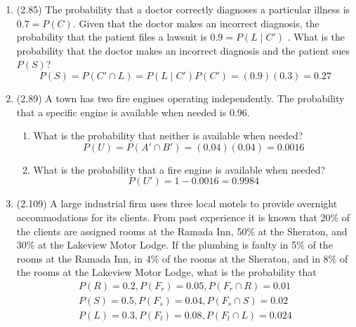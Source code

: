 \documentclass[basic, header]{nosvagor-notes}
\begin{document}
\begin{enumerate}[itemsep=4em]

  \item (2.85) The probability that a doctor correctly diagnoses a particular
    illness is \(0.7 = P(C)\). Given that the doctor makes an incorrect diagnosis, the
    probability that the patient files a lawsuit is \(0.9 = P(L \mid C')\) . What is the
    probability that the doctor makes an incorrect diagnosis and the patient
    sues \(P(S)\)?
    \[%
      P(S) = P(C' \cap L ) = P(L\mid C')P(C') = (0.9)(0.3) = \boxed{0.27}
    \]%

  \item (2.89) A town has two fire engines operating independently. The
    probability that a specific engine is available when needed is 0.96.

    \begin{enumerate}

      \item What is the probability that neither is available when needed?
        \[%
          P(U) = P(A' \cap B') = (0.04)(0.04) = \boxed{0.0016}
        \]%

      \item What is the probability that a fire engine is available when
        needed?
        \[%
          P(U') = 1 - 0.0016 = \boxed{0.9984}
        \]%

    \end{enumerate}

  \item (2.109) A large industrial firm uses three local motels to provide
    overnight accommodations for its clients. From past experience it is known
    that 20\% of the clients are assigned rooms at the Ramada Inn, 50\% at the
    Sheraton, and 30\% at the Lakeview Motor Lodge. If the plumbing is faulty
    in 5\% of the rooms at the Ramada Inn, in 4\% of the rooms at the Sheraton,
    and in 8\% of the rooms at the Lakeview Motor Lodge, what is the
    probability that
      \begin{align*}
        P(R) = 0.2, P(F_r) = 0.05, P(F_r \cap R) = 0.01 \\
        P(S) = 0.5, P(F_s) = 0.04, P(F_s \cap S) = 0.02 \\
        P(L) = 0.3, P(F_l) = 0.08, P(F_l \cap L) = 0.024
      \end{align*}
    \begin{enumerate}


\end{enumerate}
\end{enumerate}
\end{document}
